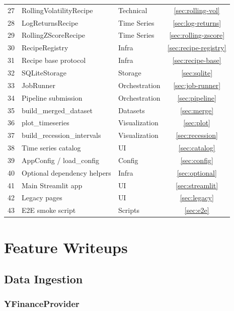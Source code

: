 \documentclass[11pt,a4paper]{article}
\begin{document}
\begin{longtable}{@{}cllc@{}}
  27 & RollingVolatilityRecipe & Technical & \ref{sec:rolling-vol} \\
  28 & LogReturnsRecipe & Time Series & \ref{sec:log-returns} \\
  29 & RollingZScoreRecipe & Time Series & \ref{sec:rolling-zscore} \\
  30 & RecipeRegistry & Infra & \ref{sec:recipe-registry} \\
  31 & Recipe base protocol & Infra & \ref{sec:recipe-base} \\
  32 & SQLiteStorage & Storage & \ref{sec:sqlite} \\
  33 & JobRunner & Orchestration & \ref{sec:job-runner} \\
  34 & Pipeline submission & Orchestration & \ref{sec:pipeline} \\
  35 & build\_merged\_dataset & Datasets & \ref{sec:merge} \\
  36 & plot\_timeseries & Visualization & \ref{sec:plot} \\
  37 & build\_recession\_intervals & Visualization & \ref{sec:recession} \\
  38 & Time series catalog & UI & \ref{sec:catalog} \\
  39 & AppConfig / load\_config & Config & \ref{sec:config} \\
  40 & Optional dependency helpers & Infra & \ref{sec:optional} \\
  41 & Main Streamlit app & UI & \ref{sec:streamlit} \\
  42 & Legacy pages & UI & \ref{sec:legacy} \\
  43 & E2E smoke script & Scripts & \ref{sec:e2e} \\
\end{longtable}

\newpage

\section{Feature Writeups}

\subsection{Data Ingestion}

\subsubsection{YFinanceProvider}\label{sec:yfinance}
\end{document}
